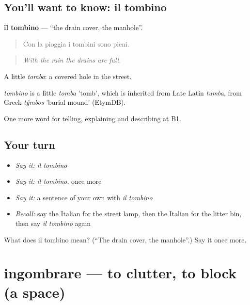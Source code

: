\subsection*{You'll want to know: il tombino}
\textbf{il tombino} — \textquotedblleft{}the drain cover, the manhole\textquotedblright{}.

\begin{quote}
Con la pioggia i tombini sono pieni.
\end{quote}

\begin{quote}
\emph{With the rain the drains are full.}
\end{quote}

A little \emph{tomba}: a covered hole in the street.

\begin{cousinweb}
\emph{tombino} is a little \emph{tomba} 'tomb', which is inherited from Late Latin \emph{tumba}, from Greek \emph{týmbos} 'burial mound' (EtymDB).
\end{cousinweb}

\begin{grammarlens}[title={What you've built}]
One more word for telling, explaining and describing at B1.
\end{grammarlens}

\subsection*{Your turn}
\begin{itemize}
\raggedright
  \item \emph{Say it:} \emph{il tombino}
  \item \emph{Say it:} \emph{il tombino}, once more
  \item \emph{Say it:} a sentence of your own with \emph{il tombino}
  \item \emph{Recall:} say the Italian for the street lamp, then the Italian for the litter bin, then say \emph{il tombino} again
\end{itemize}

\begin{tcolorbox}[breakable,colback=teal!4,colframe=teal!35!black,title={Before you move on}]
What does il tombino mean? (\textquotedblleft{}The drain cover, the manhole\textquotedblright{}.) Say it once more.
\end{tcolorbox}
\section[ingombrare]{ingombrare — to clutter, to block (a space)}

